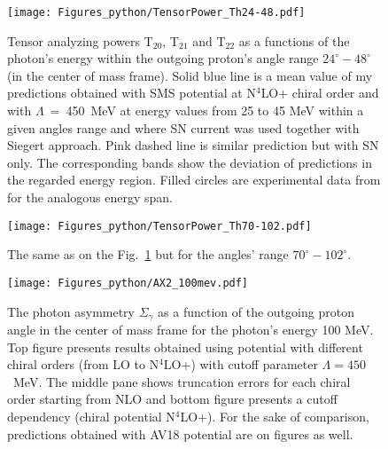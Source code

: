     \begin{figure}[h]
        \begin{center}
        \texttt{[image: Figures\_python/TensorPower\_Th24-48.pdf]}
        \end{center}
        \caption{Tensor analyzing powers T$_{20}$, T$_{21}$ and T$_{22}$ as a functions of the
        photon's energy within the outgoing proton's angle range $24^{\circ} - 48^{\circ}$
        (in the center of mass frame).
        Solid blue line is a mean value of my predictions obtained with
        SMS potential at N$^4$LO+ chiral order and with $\Lambda$~=~450~MeV
        at energy values from 25 to 45 MeV within
        a given angles range and
        where SN current was used together with Siegert approach. 
        Pink dashed line is similar prediction but with SN only. 
        The corresponding bands show the deviation of predictions in the regarded
        energy region.
        Filled circles are experimental data
        from \cite{rachek2007} for the analogous energy span.}
        \label{tensor_energy_24-48}
    \end{figure}

    \begin{figure}[h]
        \begin{center}
        \texttt{[image: Figures\_python/TensorPower\_Th70-102.pdf]}
        \end{center}
        \caption{The same as on the Fig.~\ref*{tensor_energy_24-48} but
        for the angles' range $70^{\circ} - 102^{\circ}$.}
        \label{tensor_energy_70-102}
    \end{figure}
    
    
    \begin{figure}[h]
        \begin{center}
        \texttt{[image: Figures\_python/AX2\_100mev.pdf]}
        \end{center}
        \caption{The photon asymmetry $\Sigma_\gamma$ 
        as a function of the outgoing proton angle in the center of mass frame 
        for the photon's energy 100 MeV.
        Top figure presents results obtained using potential
        with different chiral orders (from LO to N$^4$LO+) with cutoff parameter $\Lambda=450$~MeV.
        The middle pane shows truncation errors for each 
        chiral order starting from NLO and
        bottom figure presents a cutoff dependency (chiral potential N$^4$LO+).
        For the sake of comparison, predictions obtained with AV18 potential are on  figures as well.}
        \label{AX_100_vert}
    \end{figure}
    
